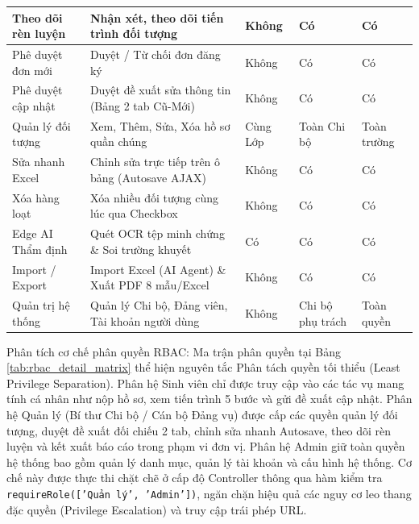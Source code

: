 \documentclass[12pt,a4paper]{report}
\begin{document}
{\begin{xltabular}{\linewidth}{|>{\raggedright\arraybackslash}p{3.2cm}|>{\raggedright\arraybackslash}X|>{\centering\arraybackslash}p{2.1cm}|>{\centering\arraybackslash}p{2.2cm}|>{\centering\arraybackslash}p{2.2cm}|}
    Theo dõi rèn luyện & Nhận xét, theo dõi tiến trình đối tượng         & Không                  & Có                      & Có                    \\ \hline
    Phê duyệt đơn mới  & Duyệt / Từ chối đơn đăng ký                     & Không                  & Có                      & Có                    \\ \hline
    Phê duyệt cập nhật & Duyệt đề xuất sửa thông tin (Bảng 2 tab Cũ-Mới) & Không                  & Có                      & Có                    \\ \hline
    Quản lý đối tượng  & Xem, Thêm, Sửa, Xóa hồ sơ quần chúng            & Cùng Lớp               & Toàn Chi bộ             & Toàn trường           \\ \hline
    Sửa nhanh Excel    & Chỉnh sửa trực tiếp trên ô bảng (Autosave AJAX) & Không                  & Có                      & Có                    \\ \hline
    Xóa hàng loạt      & Xóa nhiều đối tượng cùng lúc qua Checkbox       & Không                  & Có                      & Có                    \\ \hline
    Edge AI Thẩm định  & Quét OCR tệp minh chứng \& Soi trường khuyết    & Có                     & Có                      & Có                    \\ \hline
    Import / Export    & Import Excel (AI Agent) \& Xuất PDF 8 mẫu/Excel & Không                  & Có                      & Có                    \\ \hline
    Quản trị hệ thống  & Quản lý Chi bộ, Đảng viên, Tài khoản người dùng & Không                  & Chi bộ phụ trách        & Toàn quyền            \\ \hline
  \end{xltabular}}

Phân tích cơ chế phân quyền RBAC: Ma trận phân quyền tại Bảng \ref{tab:rbac_detail_matrix} thể hiện nguyên tắc Phân tách quyền tối thiểu (Least Privilege Separation). Phân hệ Sinh viên chỉ được truy cập vào các tác vụ mang tính cá nhân như nộp hồ sơ, xem tiến trình 5 bước và gửi đề xuất cập nhật. Phân hệ Quản lý (Bí thư Chi bộ / Cán bộ Đảng vụ) được cấp các quyền quản lý đối tượng, duyệt đề xuất đối chiếu 2 tab, chỉnh sửa nhanh Autosave, theo dõi rèn luyện và kết xuất báo cáo trong phạm vi đơn vị. Phân hệ Admin giữ toàn quyền hệ thống bao gồm quản lý danh mục, quản lý tài khoản và cấu hình hệ thống. Cơ chế này được thực thi chặt chẽ ở cấp độ Controller thông qua hàm kiểm tra \texttt{requireRole(['Quản lý', 'Admin'])}, ngăn chặn hiệu quả các nguy cơ leo thang đặc quyền (Privilege Escalation) và truy cập trái phép URL.
\end{document}
